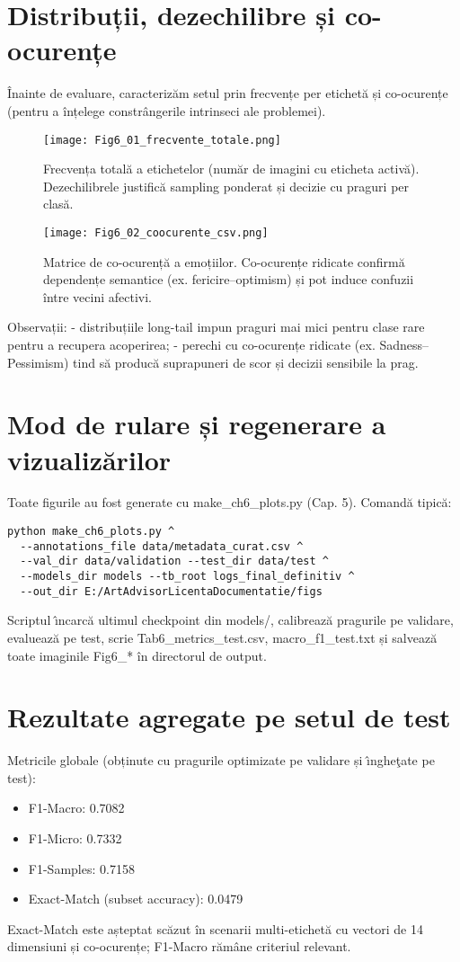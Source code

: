 \section{Distribuții, dezechilibre și co-ocurențe}
Înainte de evaluare, caracterizăm setul prin frecvențe per etichetă și co-ocurențe (pentru a înțelege constrângerile intrinseci ale problemei).

\begin{figure}[tb]
  \centering
  \texttt{[image: Fig6\_01\_frecvente\_totale.png]}
  \caption{Frecvența totală a etichetelor (număr de imagini cu eticheta activă). Dezechilibrele justifică sampling ponderat și decizie cu praguri per clasă.}
  \label{fig:c6-frecvente}
\end{figure}

\begin{figure}[tb]
  \centering
  \texttt{[image: Fig6\_02\_coocurente\_csv.png]}
  \caption{Matrice de co-ocurență a emoțiilor. Co-ocurențe ridicate confirmă dependențe semantice (ex. fericire–optimism) și pot induce confuzii între vecini afectivi.}
  \label{fig:c6-cooc}
\end{figure}

\noindent Observații:
- distribuțiile long-tail impun praguri mai mici pentru clase rare pentru a recupera acoperirea;
- perechi cu co-ocurențe ridicate (ex. Sadness–Pessimism) tind să producă suprapuneri de scor și decizii sensibile la prag.

\section{Mod de rulare și regenerare a vizualizărilor}
Toate figurile au fost generate cu make\_ch6\_plots.py (Cap. 5). Comandă tipică:
\begin{verbatim}
python make_ch6_plots.py ^
  --annotations_file data/metadata_curat.csv ^
  --val_dir data/validation --test_dir data/test ^
  --models_dir models --tb_root logs_final_definitiv ^
  --out_dir E:/ArtAdvisorLicentaDocumentatie/figs
\end{verbatim}
Scriptul \^{\i}ncarc\u{a} ultimul checkpoint din models/, calibreaz\u{a} pragurile pe validare, evalueaz\u{a} pe test, scrie Tab6\_metrics\_test.csv, macro\_f1\_test.txt și salveaz\u{a} toate imaginile Fig6\_* în directorul de output.

\section{Rezultate agregate pe setul de test}
Metricile globale (obținute cu pragurile optimizate pe validare și \^{\i}nghe\c{t}ate pe test):
\begin{itemize}
  \item F1-Macro: 0.7082
  \item F1-Micro: 0.7332
  \item F1-Samples: 0.7158
  \item Exact-Match (subset accuracy): 0.0479
\end{itemize}
Exact-Match este așteptat scăzut în scenarii multi-etichetă cu vectori de 14 dimensiuni și co-ocurențe; F1-Macro rămâne criteriul relevant.

